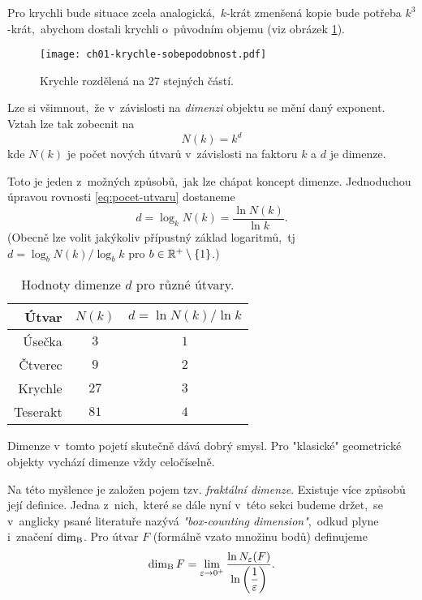 Pro krychli bude situace zcela analogická,~$k$-krát zmenšená kopie bude potřeba $k^3$-krát,~abychom dostali krychli o~původním objemu (viz obrázek \ref{fig:krychle-sobepodobnost}).
\begin{figure}[h]
    \centering
    \texttt{[image: ch01-krychle-sobepodobnost.pdf]}
    \caption{Krychle rozdělená na 27 stejných částí.}
    \label{fig:krychle-sobepodobnost}
\end{figure}
Lze si všimnout,~že v~závislosti na \emph{dimenzi} objektu se mění daný exponent. Vztah lze tak zobecnit na
\begin{equation}\label{eq:pocet-utvaru}
    N(k)=k^d
\end{equation}
kde $N(k)$ je počet nových útvarů v~závislosti na faktoru $k$ a $d$ je dimenze.\par
Toto je jeden z~možných způsobů,~jak lze chápat koncept dimenze. Jednoduchou úpravou rovnosti \eqref{eq:pocet-utvaru} dostaneme
\[d=\log_k{N(k)}=\dfrac{\ln{N(k)}}{\ln{k}}.\]
(Obecně lze volit jakýkoliv přípustný základ logaritmů,~tj $d=\log_b{N(k)}/\log_b{k}$ pro $b\in\mathbb{R}^+\setminus\left\{1\right\}$.)
\begin{table}[h]
    \centering
    \begin{tabular}{r|cc}
    Útvar    & $N(k)$ & $d=\ln{N(k)}/\ln{k}$ \\ \hline
    Úsečka   & $3$      & $1$                          \\
    Čtverec  & $9$      & $2$                          \\
    Krychle  & $27$     & $3$                          \\
    Teserakt & $81$     & $4$                          \\
    \end{tabular}
    \caption{Hodnoty dimenze $d$ pro různé útvary.}
    \label{table:eukleides-dimenze}
\end{table}
Dimenze v~tomto pojetí skutečně dává dobrý smysl. Pro "klasické" geometrické objekty vychází dimenze vždy celočíselně.\par
Na této myšlence je založen pojem tzv. \emph{fraktální dimenze}. Existuje více způsobů její definice. Jedna z~nich,~které se dále nyní v~této sekci budeme držet,~se v~anglicky psané literatuře nazývá \emph{"box-counting dimension"},~odkud plyne i~značení $\operatorname{dim_B}$. Pro útvar $F$ (formálně vzato množinu bodů) definujeme 
\begin{equation}\label{eq:fraktalni-dimenze}
    \operatorname{dim_B}{F}=\lim_{\varepsilon\to 0^+}{\dfrac{\ln{N_\varepsilon(F)}}{\ln{\left(\dfrac{1}{\varepsilon}\right)}}}.
\end{equation}
